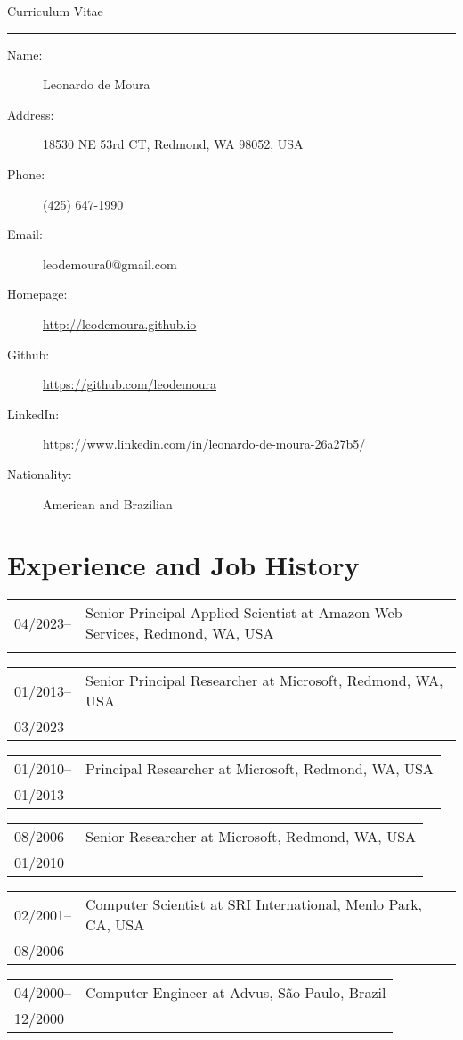 \documentclass{article}
\newcommand{\job}[4]{\begin{flushleft}
                                        \begin{tabular}{ll}
                                         #1-- & #3 \\
                     #2 & #4 \\
                    \end{tabular}
                                        \end{flushleft}
                    }
\begin{document}
{
\begin{flushleft}
{\Huge{Curriculum Vitae}} \\
\hspace{.1in}
\hrule
\end{flushleft}
}




\begin{description}
\item [Name:] Leonardo de Moura
\item [Address:] 18530 NE 53rd CT, Redmond, WA 98052, USA
\item [Phone:] (425) 647-1990
\item [Email:] leodemoura0@gmail.com
\item [Homepage:] \url{http://leodemoura.github.io}
\item [Github:] \url{https://github.com/leodemoura}
\item [LinkedIn:] \url{https://www.linkedin.com/in/leonardo-de-moura-26a27b5/}
\item [Nationality:] American and Brazilian
\end{description}

\section*{Experience and Job History}

\job{04/2023}{}{Senior Principal Applied Scientist at Amazon Web Services, Redmond, WA, USA}{}

\job{01/2013}{03/2023}{Senior Principal Researcher at Microsoft, Redmond, WA, USA}{}

\job{01/2010}{01/2013}{Principal Researcher at Microsoft, Redmond, WA, USA}{}

\job{08/2006}{01/2010}{Senior Researcher at Microsoft, Redmond, WA, USA}{}

\job{02/2001}{08/2006}{Computer Scientist at SRI International, Menlo Park, CA, USA}{}

\job{04/2000}{12/2000}{Computer Engineer at Advus, S\~{a}o Paulo, Brazil}{}
\end{document}
